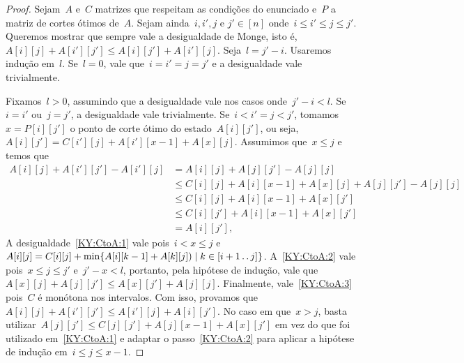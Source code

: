 \begin{proof}
Sejam~$A$ e~$C$ matrizes que respeitam as condições do enunciado e~$P$ a matriz de cortes ótimos de~$A$. Sejam ainda~$i,i',j$ e $j' \in [n]$ onde~$i \leq i' \leq j \leq j'$. Queremos mostrar que sempre vale a desigualdade de Monge, isto é,~${A[i][j] + A[i'][j'] \leq A[i][j'] + A[i'][j]}$. Seja~$l = j' - i$. Usaremos indução em~$l$. Se~${l = 0}$, vale que~${i = i' = j = j'}$ e a desigualdade vale trivialmente.

Fixamos~$l > 0$, assumindo que a desigualdade vale nos casos onde~${j' - i < l}$. Se~$i = i'$ ou~$j = j'$, a desigualdade vale trivialmente. Se~${i < i' = j < j'}$, tomamos~${x = P[i][j']}$ o ponto de corte ótimo do estado~$A[i][j']$, ou seja,~${A[i][j'] = C[i'][j] + A[i'][x-1] + A[x][j]}$. Assumimos que~${x \leq j}$ e temos que
\begin{align}
A[i][j] + A[i'][j'] - A[i'][j] &= A[i][j] + A[j][j'] - A[j][j] \nonumber \\
                               &\leq C[i][j] + A[i][x-1] + A[x][j] + A[j][j'] - A[j][j] \label{KY:CtoA:1} \\
                               &\leq C[i][j] + A[i][x-1] + A[x][j'] \label{KY:CtoA:2} \\
                               &\leq C[i][j'] + A[i][x-1] + A[x][j'] \label{KY:CtoA:3} \\
                               &= A[i][j'] \text{,} \nonumber
\end{align}
A desigualdade~\eqref{KY:CtoA:1} vale pois~${i < x \leq j}$ e~${A[i][j] = C[i][j] + \min\limits \{ A[i][k-1] + A[k][j]) \mid k \in [i+1 \,.\,.\, j]\} }$. A~\eqref{KY:CtoA:2} vale pois~${x \leq j \leq j'}$ e~$j' - x < l$, portanto, pela hipótese de indução, vale que~${A[x][j] + A[j][j'] \leq A[x][j'] + A[j][j]}$. Finalmente, vale~\eqref{KY:CtoA:3} pois~$C$ é monótona nos intervalos. Com isso, provamos que~${A[i][j] + A[i'][j'] \leq A[i'][j] + A[i][j']}$. No caso em que~${x > j}$, basta utilizar~${A[j][j'] \leq C[j][j'] + A[j][x-1] + A[x][j']}$ em vez do que foi utilizado em~\eqref{KY:CtoA:1} e adaptar o passo~\eqref{KY:CtoA:2} para aplicar a hipótese de indução em~${i \leq j \leq x-1}$.


\end{proof}
